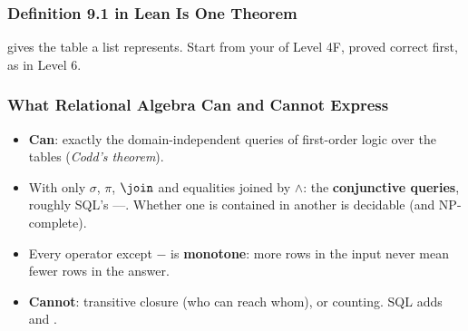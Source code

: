 \documentclass{ltx-talk}
\begin{document}
\begin{frame*}
  \frametitle{Definition 9.1 in Lean Is One Theorem}
  \sketch
   gives the table a list represents. Start from your
   of Level 4F, proved correct first, as in Level 6.
\end{frame*}


\begin{frame}
  \frametitle{What Relational Algebra Can and Cannot Express}
  \begin{itemize}
    \item \textbf{Can}: exactly the domain-independent queries of
      first-order logic over the tables (\emph{Codd's theorem}).
    \item With only $\sigma$, $\pi$, $\join$ and equalities joined by
      $\wedge$: the \textbf{conjunctive queries}, roughly SQL's
      ----. Whether one is contained
      in another is decidable (and NP-complete).
    \item Every operator except $-$ is \textbf{monotone}: more rows in
      the input never mean fewer rows in the answer.
    \item \textbf{Cannot}: transitive closure (who can reach whom), or
      counting. SQL adds  and .
  \end{itemize}
  \stretchtag
\end{frame}
\end{document}
